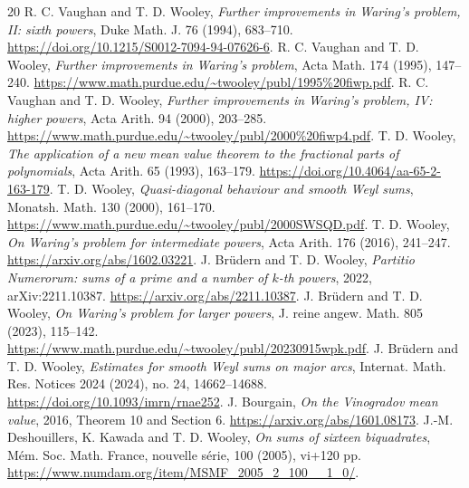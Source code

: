 \documentclass[11pt,letterpaper]{article}
\numberwithin{equation}{section}
\begin{document}
\clearpage
\begin{thebibliography}{20}\small
{} R. C. Vaughan and T. D. Wooley,
\emph{Further improvements in Waring's problem, II: sixth powers},
Duke Math. J. 76 (1994), 683--710.
\url{https://doi.org/10.1215/S0012-7094-94-07626-6}.
 R. C. Vaughan and T. D. Wooley,
\emph{Further improvements in Waring's problem},
Acta Math. 174 (1995), 147--240.
\url{https://www.math.purdue.edu/~twooley/publ/1995%20fiwp.pdf}.
 R. C. Vaughan and T. D. Wooley,
\emph{Further improvements in Waring's problem, IV: higher powers},
Acta Arith. 94 (2000), 203--285.
\url{https://www.math.purdue.edu/~twooley/publ/2000%20fiwp4.pdf}.
 T. D. Wooley,
\emph{The application of a new mean value theorem to the fractional parts
of polynomials}, Acta Arith. 65 (1993), 163--179.
\url{https://doi.org/10.4064/aa-65-2-163-179}.
 T. D. Wooley,
\emph{Quasi-diagonal behaviour and smooth Weyl sums},
Monatsh. Math. 130 (2000), 161--170.
\url{https://www.math.purdue.edu/~twooley/publ/2000SWSQD.pdf}.
 T. D. Wooley,
\emph{On Waring's problem for intermediate powers},
Acta Arith. 176 (2016), 241--247.
\url{https://arxiv.org/abs/1602.03221}.
 J. Br\"udern and T. D. Wooley,
\emph{Partitio Numerorum: sums of a prime and a number of $k$-th powers},
2022, arXiv:2211.10387. \url{https://arxiv.org/abs/2211.10387}.
 J. Br\"udern and T. D. Wooley,
\emph{On Waring's problem for larger powers},
J. reine angew. Math. 805 (2023), 115--142.
\url{https://www.math.purdue.edu/~twooley/publ/20230915wpk.pdf}.
 J. Br\"udern and T. D. Wooley,
\emph{Estimates for smooth Weyl sums on major arcs},
Internat. Math. Res. Notices 2024 (2024), no. 24, 14662--14688.
\url{https://doi.org/10.1093/imrn/rnae252}.
 J. Bourgain, \emph{On the Vinogradov mean value}, 2016,
Theorem 10 and Section 6. \url{https://arxiv.org/abs/1601.08173}.
 J.-M. Deshouillers, K. Kawada and T. D. Wooley,
\emph{On sums of sixteen biquadrates},
M\'em. Soc. Math. France, nouvelle s\'erie, 100 (2005), vi+120 pp.
\url{https://www.numdam.org/item/MSMF_2005_2_100__1_0/}.
\end{thebibliography}
\end{document}
